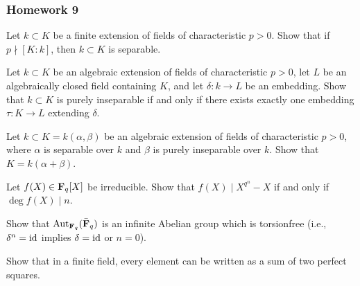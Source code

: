 \subsubsection{Homework 9}
\setcounter{exercise}{0}
\setcounter{equation}{0}

\begin{problem}
  Let $k\subset K$ be a finite extension of fields of characteristic
  $p>0$. Show that if $p\nmid[K:k]$, then $k\subset K$ is separable.
\end{problem}
\begin{solution}
\end{solution}

\begin{problem}
  Let $k\subset K$ be an algebraic extension of fields of characteristic
  $p>0$, let $L$ be an algebraically closed field containing $K$, and let
  $\delta\colon k\to L$ be an embedding. Show that $k\subset K$ is purely
  inseparable if and only if there exists exactly one embedding
  $\tau\colon K\to L$ extending $\delta$.
\end{problem}
\begin{solution}
\end{solution}

\begin{problem}
  Let $k\subset K=k(\alpha,\beta)$ be an algebraic extension of fields of
  characteristic $p>0$, where $\alpha$ is separable over $k$ and $\beta$ is
  purely inseparable over $k$. Show that $K=k(\alpha+\beta)$.
\end{problem}
\begin{solution}
\end{solution}

\begin{problem}
  Let $f(X)\in\mathbf{F}_q[X]$ be irreducible. Show that $f(X)\mid X^{q^n}-X$ if
  and only if $\deg f(X)\mid n$.
\end{problem}
\begin{solution}
\end{solution}

\begin{problem}
  Show that $\operatorname{Aut}_{\mathbf{F}_q}(\bar{\mathbf{F}}_q)$ is an infinite Abelian group which
  is torsionfree (i.e., $\delta^n=\operatorname{id}$ implies $\delta=\operatorname{id}$ or $n=0$).
\end{problem}
\begin{solution}
\end{solution}

\begin{problem}
  Show that in a finite field, every element can be written as a sum of two
  perfect squares.
\end{problem}
\begin{solution}
\end{solution}


